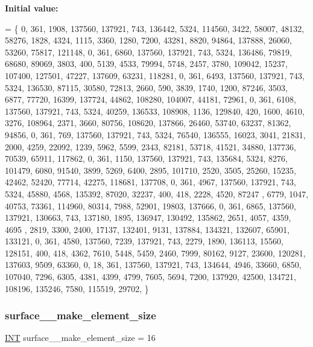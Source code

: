 {\bfseries Initial value\+:}
\begin{DoxyCode}
= \{ 
    0, 361, 1908, 137560, 137921, 743, 136442, 5324, 114560, 3422, 58007, 48132, 58276, 1828, 4324, 1115, 
      3360, 1280, 7200, 43281, 8820, 94864, 137888, 26060, 53260, 75817, 121148, 
    0, 361, 6860, 137560, 137921, 743, 5324, 136486, 79819, 68680, 89069, 3803, 400, 5139, 4533, 79994, 
      5748, 2457, 3780, 109042, 15237, 107400, 127501, 47227, 137609, 63231, 118281, 
    0, 361, 6493, 137560, 137921, 743, 5324, 136530, 87115, 30580, 72813, 2660, 590, 3839, 1740, 1200, 
      87246, 3503, 6877, 77720, 16399, 137724, 44862, 108280, 104007, 44181, 72961, 
    0, 361, 6108, 137560, 137921, 743, 5324, 40259, 136533, 108908, 1136, 129840, 420, 1600, 4610, 3276, 
      108964, 2371, 3660, 80756, 108620, 137866, 26460, 53740, 63237, 81362, 94856, 
    0, 361, 769, 137560, 137921, 743, 5324, 76540, 136555, 16023, 3041, 21831, 2000, 4259, 22092, 1239, 
      5962, 5599, 2343, 82181, 53718, 41521, 34880, 137736, 70539, 65911, 117862, 
    0, 361, 1150, 137560, 137921, 743, 135684, 5324, 8276, 101479, 6080, 91540, 3899, 5269, 6400, 2895, 
      101710, 2520, 3505, 25260, 15235, 42462, 52420, 77714, 42275, 118681, 137708, 
    0, 361, 4967, 137560, 137921, 743, 5324, 45880, 4568, 135392, 87020, 32237, 400, 418, 2228, 4520, 87247
      , 6779, 1047, 40753, 73361, 114960, 80314, 7988, 52901, 19803, 137666, 
    0, 361, 6865, 137560, 137921, 130663, 743, 137180, 1895, 136947, 130492, 135862, 2651, 4057, 4359, 4695
      , 2819, 3300, 2400, 17137, 132401, 9131, 137884, 134321, 132607, 65901, 133121, 
    0, 361, 4580, 137560, 7239, 137921, 743, 2279, 1890, 136113, 15560, 128151, 400, 418, 4362, 7610, 5448,
       5459, 2460, 7999, 80162, 9127, 23600, 120281, 137603, 9509, 63360, 
    0, 18, 361, 137560, 137921, 743, 134644, 4946, 33660, 6850, 107040, 7296, 6305, 4381, 4399, 4799, 7605,
       5694, 7200, 137920, 42500, 134721, 108196, 135246, 7580, 115519, 29702, 
\}
\end{DoxyCode}
\mbox{\label{surface__19_8_c_a1918fec16222a683deeff40744f3d5a4}} 
\subsubsection{\texorpdfstring{surface\+\_\+\_\+make\+\_\+element\+\_\+size}{surface\_19\_make\_element\_size}}
{\footnotesize\ttfamily \mbox{\hyperlink{galois_8h_a09fddde158a3a20bd2dcadb609de11dc}{I\+NT}} surface\+\_\+\_\+make\+\_\+element\+\_\+size = 16}

